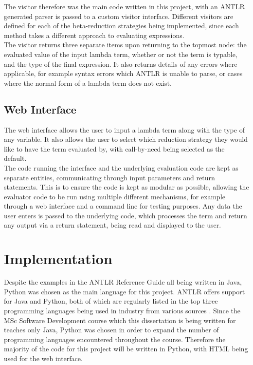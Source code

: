 \documentclass[a4paper,11pt]{report}
\begin{document}
The visitor therefore was the main code written in this project, with an ANTLR generated parser is passed to a custom visitor interface. Different visitors are defined for each of the beta-reduction strategies being implemented, since each method takes a different approach to evaluating expressions.\\

The visitor returns three separate items upon returning to the topmost node: the evaluated value of the input lambda term, whether or not the term is typable, and the type of the final expression. It also returns details of any errors where applicable, for example syntax errors which ANTLR is unable to parse, or cases where the normal form of a lambda term does not exist.

\subsection{Web Interface}

The web interface allows the user to input a lambda term along with the type of any variable. It also allows the user to select which reduction strategy they would like to have the term evaluated by, with call-by-need being selected as the default.\\

The code running the interface and the underlying evaluation code are kept as separate entities, communicating through input parameters and return statements. This is to ensure the code is kept as modular as possible, allowing the evaluator code to be run using multiple different mechanisms, for example through a web interface and a command line for testing purposes. Any data the user enters is passed to the underlying code, which processes the term and return any output via a return statement, being read and displayed to the user.

\section{Implementation}

Despite the examples in the ANTLR Reference Guide \cite{Parr2012} all being written in Java, Python was chosen as the main language for this project. ANTLR offers support for Java and Python, both of which are regularly listed in the top three programming languages being used in industry from various sources \cite{ProgLang1}\cite{ProgLang2}\cite{ProgLang3}. Since the MSc Software Development course which this dissertation is being written for teaches only Java, Python was chosen in order to expand the number of programming languages encountered throughout the course. Therefore the majority of the code for this project will be written in Python, with HTML being used for the web interface.
\end{document}
